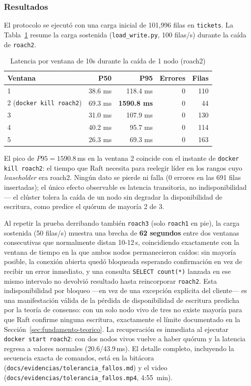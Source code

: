 \subsubsection{Resultados}

El protocolo se ejecutó con una carga inicial de 101{,}996 filas en \texttt{tickets}. La
Tabla~\ref{tab:tolerancia-1nodo} resume la carga sostenida (\texttt{load\_write.py},
100 filas/s) durante la caída de \texttt{roach2}.

\begin{table}[H]
\centering
\caption{Latencia por ventana de 10s durante la caída de 1 nodo (roach2)}
\label{tab:tolerancia-1nodo}
\begin{tabular}{@{}lrrrr@{}}
\toprule
\textbf{Ventana} & \textbf{P50} & \textbf{P95} & \textbf{Errores} & \textbf{Filas} \\
\midrule
1 & 38.6 ms & 118.4 ms & 0 & 110 \\
2 (\texttt{docker kill roach2}) & 69.3 ms & \textbf{1590.8 ms} & 0 & 44 \\
3 & 31.0 ms & 107.9 ms & 0 & 130 \\
4 & 40.2 ms & 95.7 ms & 0 & 114 \\
5 & 26.3 ms & 69.3 ms & 0 & 163 \\
\bottomrule
\end{tabular}
\end{table}

El pico de $P95=1590.8$\,ms en la ventana 2 coincide con el instante de \texttt{docker kill
roach2}: el tiempo que Raft necesita para reelegir líder en los rangos cuyo \emph{leaseholder} era
roach2. Ningún dato se pierde ni falla (0 errores en las 691 filas insertadas); el único efecto
observable es latencia transitoria, no indisponibilidad — el clúster tolera la caída de un nodo
sin degradar la disponibilidad de escritura, como predice el quórum de mayoría 2 de 3.

Al repetir la prueba derribando también \texttt{roach3} (solo \texttt{roach1} en pie), la carga
sostenida (50 filas/s) muestra una brecha de \textbf{62 segundos} entre dos ventanas consecutivas
que normalmente distan 10-12\,s, coincidiendo exactamente con la ventana de tiempo en la que
ambos nodos permanecieron caídos: sin mayoría posible, la conexión abierta quedó bloqueada
esperando confirmación en vez de recibir un error inmediato, y una consulta
\texttt{SELECT count(*)} lanzada en ese mismo intervalo no devolvió resultado hasta reincorporar
\texttt{roach2}. Esta indisponibilidad por bloqueo —en vez de una excepción explícita del
cliente— es una manifestación válida de la pérdida de disponibilidad de escritura predicha por la
teoría de consenso: con un solo nodo vivo de tres no existe mayoría para que Raft confirme ninguna
escritura, exactamente el límite documentado en la Sección~\ref{sec:fundamento-teorico}. La
recuperación es inmediata al ejecutar \texttt{docker start roach2}: con dos nodos vivos vuelve a
haber quórum y la latencia regresa a valores normales (20.6/43.9\,ms). El detalle completo,
incluyendo la secuencia exacta de comandos, está en la bitácora
(\texttt{docs/evidencias/tolerancia\_fallos.md}) y el video
(\texttt{docs/evidencias/tolerancia\_fallos.mp4}, 4:55~min).

